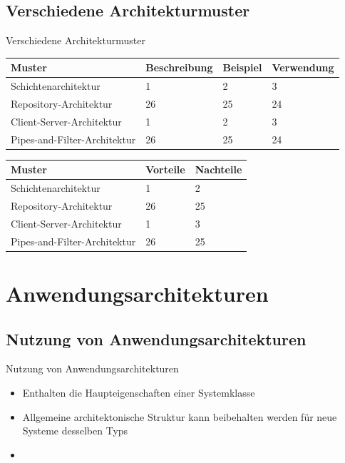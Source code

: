\documentclass{beamer}
\begin{document}
			\subsection{Verschiedene Architekturmuster}
			\begin{frame}[allowframebreaks]{Verschiedene Architekturmuster}
			\begin{tabular}{*{4}{l}}
				\toprule
				Muster&Beschreibung&Beispiel&Verwendung\\
				\midrule
				Schichtenarchitektur & 1&2&3\\
				Repository-Architektur & 26&25&24\\
				Client-Server-Architektur & 1&2&3\\
				Pipes-and-Filter-Architektur & 26&25&24\\

				\bottomrule
			\end{tabular}
			
			\begin{tabular}{*{3}{l}}
				\toprule
				Muster&Vorteile&Nachteile\\
				\midrule
				Schichtenarchitektur   & 1&2\\
				Repository-Architektur   & 26&25\\
				Client-Server-Architektur & 1&3\\
				Pipes-and-Filter-Architektur  & 26&25\\
				\bottomrule
			\end{tabular}
			\end{frame}		
	\section{Anwendungsarchitekturen}
		\subsection{Nutzung von Anwendungsarchitekturen}
			\begin{frame}{Nutzung von Anwendungsarchitekturen}
				\begin{itemize} %
					\item Enthalten die Haupteigenschaften einer Systemklasse
					\item Allgemeine architektonische Struktur kann beibehalten werden für neue Systeme desselben Typs
					\item
				\end{itemize}
			\end{frame}
\end{document}
